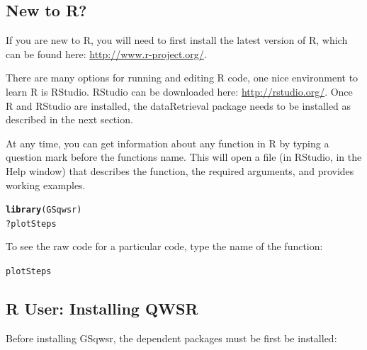 \documentclass[a4paper,11pt]{article}\usepackage[]{graphicx}\usepackage[]{color}
\makeatletter
\newcommand{\hlopt}[1]{\textcolor[rgb]{0,0,0}{#1}}%
\newcommand{\hlstd}[1]{\textcolor[rgb]{0.345,0.345,0.345}{#1}}%
\newcommand{\hlkwd}[1]{\textcolor[rgb]{0.737,0.353,0.396}{\textbf{#1}}}%
\newenvironment{kframe}{%
 \def\at@end@of@kframe{}%
 \ifinner\ifhmode%
  \def\at@end@of@kframe{\end{minipage}}%
  \begin{minipage}{\columnwidth}%
 \fi\fi%
 \def\FrameCommand##1{\hskip\@totalleftmargin \hskip-\fboxsep
 \colorbox{shadecolor}{##1}\hskip-\fboxsep
     \hskip-\linewidth \hskip-\@totalleftmargin \hskip\columnwidth}%
 \MakeFramed {\advance\hsize-\width
   \@totalleftmargin\z@ \linewidth\hsize
   \@setminipage}}%
 {\par\unskip\endMakeFramed%
 \at@end@of@kframe}
\newenvironment{knitrout}{}{} %
\makeatother
\begin{document}
\subsection{New to R?}
If you are new to R, you will need to first install the latest version of R, which can be found here: \url{http://www.r-project.org/}.

There are many options for running and editing R code, one nice environment to learn R is RStudio. RStudio can be downloaded here: \url{http://rstudio.org/}. Once R and RStudio are installed, the dataRetrieval package needs to be installed as described in the next section.

At any time, you can get information about any function in R by typing a question mark before the functions name.  This will open a file (in RStudio, in the Help window) that describes the function, the required arguments, and provides working examples.

\begin{knitrout}
\color{fgcolor}\begin{kframe}
\begin{alltt}
\hlkwd{library}\hlstd{(GSqwsr)}
\hlopt{?}\hlstd{plotSteps}
\end{alltt}
\end{kframe}
\end{knitrout}


To see the raw code for a particular code, type the name of the function:
\begin{knitrout}
\color{fgcolor}\begin{kframe}
\begin{alltt}
\hlstd{plotSteps}
\end{alltt}
\end{kframe}
\end{knitrout}


\subsection{R User: Installing QWSR}
Before installing GSqwsr, the dependent packages must be first be installed:
\end{document}
